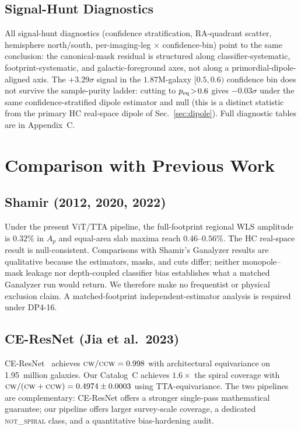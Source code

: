 \documentclass[aps,prd,twocolumn,superscriptaddress,preprintnumbers,nofootinbib,longbibliography,floatfix]{revtex4-2}
\newcommand{\CW}{\textsc{cw}}
\newcommand{\CCW}{\textsc{ccw}}
\newcommand{\NS}{\textsc{not\_spiral}}
\newcommand{\sigmaunit}{\sigma}
\begin{document}
\subsection{Signal-Hunt Diagnostics}
\label{sec:signal_hunt}

All signal-hunt diagnostics (confidence stratification, RA-quadrant scatter, hemisphere north/south, per-imaging-leg $\times$ confidence-bin) point to the same conclusion: the canonical-mask residual is structured along classifier-systematic, footprint-systematic, and galactic-foreground axes, not along a primordial-dipole-aligned axis. The $+3.29\sigmaunit$ signal in the $1.87$M-galaxy $[0.5,0.6)$ confidence bin does not survive the sample-purity ladder: cutting to $p_{\rm eq}\!>\!0.6$ gives $-0.03\sigmaunit$ under the same confidence-stratified dipole estimator and null (this is a distinct statistic from the primary HC real-space dipole of Sec.~\ref{sec:dipole}). Full diagnostic tables are in Appendix~C.

\section{Comparison with Previous Work}
\label{sec:comparison}

\subsection{Shamir (2012, 2020, 2022)}

Under the present ViT/TTA pipeline, the full-footprint regional WLS amplitude is $0.32\%$ in $A_p$ and equal-area slab maxima reach $0.46$--$0.56\%$. The HC real-space result is null-consistent. Comparisons with Shamir's Ganalyzer results are qualitative because the estimators, masks, and cuts differ; neither monopole--mask leakage nor depth-coupled classifier bias establishes what a matched Ganalyzer run would return. We therefore make no frequentist or physical exclusion claim. A matched-footprint independent-estimator analysis is required under DP4-16.

\subsection{CE-ResNet (Jia et al.\ 2023)}

CE-ResNet~\cite{Jia:2023} achieves $\CW/\CCW=0.998$ with architectural equivariance on 1.95~million galaxies. Our Catalog~C achieves $1.6\times$ the spiral coverage with $\CW/(\CW+\CCW)=0.4974\pm0.0003$ using TTA-equivariance. The two pipelines are complementary: CE-ResNet offers a stronger single-pass mathematical guarantee; our pipeline offers larger survey-scale coverage, a dedicated \NS{} class, and a quantitative bias-hardening audit.
\end{document}
